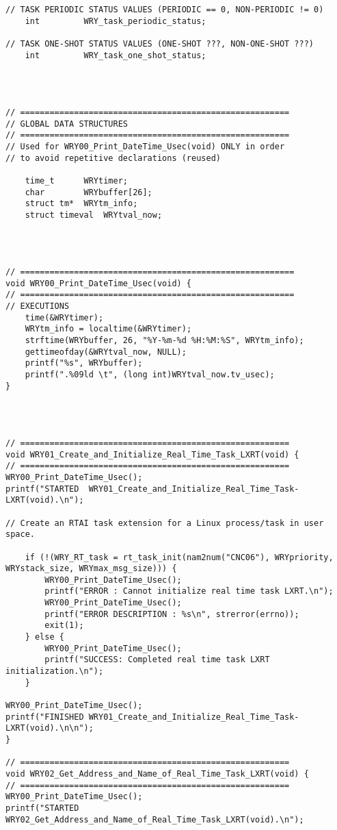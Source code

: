 \begin{lstlisting}[caption={App4-Full C-Code listing for Real Time (RTAI)}, label=App4-Full C-Code listing for Real Time (RTAI)]
// TASK PERIODIC STATUS VALUES (PERIODIC == 0, NON-PERIODIC != 0)
	int 		WRY_task_periodic_status;

// TASK ONE-SHOT STATUS VALUES (ONE-SHOT ???, NON-ONE-SHOT ???)
	int 		WRY_task_one_shot_status;




// =======================================================
// GLOBAL DATA STRUCTURES 
// =======================================================
// Used for WRY00_Print_DateTime_Usec(void) ONLY in order 
// to avoid repetitive declarations (reused) 

	time_t 		WRYtimer;
	char 		WRYbuffer[26];
	struct tm*	WRYtm_info;
	struct timeval	WRYtval_now;




// ========================================================
void WRY00_Print_DateTime_Usec(void) {
// ========================================================
// EXECUTIONS
	time(&WRYtimer);
	WRYtm_info = localtime(&WRYtimer);
	strftime(WRYbuffer, 26, "%Y-%m-%d %H:%M:%S", WRYtm_info);
	gettimeofday(&WRYtval_now, NULL);
	printf("%s", WRYbuffer);
	printf(".%09ld \t", (long int)WRYtval_now.tv_usec);
}




// =======================================================
void WRY01_Create_and_Initialize_Real_Time_Task_LXRT(void) {
// =======================================================
WRY00_Print_DateTime_Usec(); 
printf("STARTED  WRY01_Create_and_Initialize_Real_Time_Task-LXRT(void).\n");

// Create an RTAI task extension for a Linux process/task in user space.

	if (!(WRY_RT_task = rt_task_init(nam2num("CNC06"), WRYpriority, WRYstack_size, WRYmax_msg_size))) {
		WRY00_Print_DateTime_Usec();
		printf("ERROR : Cannot initialize real time task LXRT.\n");
		WRY00_Print_DateTime_Usec();
		printf("ERROR DESCRIPTION : %s\n", strerror(errno));
		exit(1);
	} else {
		WRY00_Print_DateTime_Usec();
		printf("SUCCESS: Completed real time task LXRT initialization.\n");
	}

WRY00_Print_DateTime_Usec(); 
printf("FINISHED WRY01_Create_and_Initialize_Real_Time_Task-LXRT(void).\n\n");
}

// =======================================================
void WRY02_Get_Address_and_Name_of_Real_Time_Task_LXRT(void) {
// =======================================================
WRY00_Print_DateTime_Usec(); 
printf("STARTED  WRY02_Get_Address_and_Name_of_Real_Time_Task_LXRT(void).\n");


\end{lstlisting}
